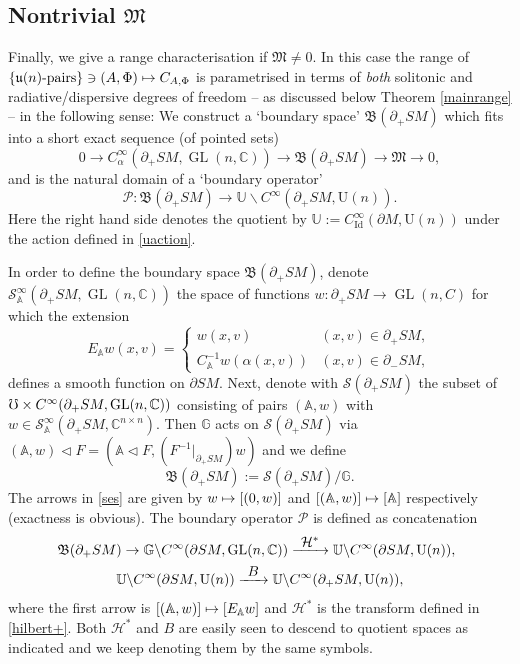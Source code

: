 \documentclass[JEP,XML,SOM,Unicode,published]{cedram}
\newcommand\To[1]{\mathchoice{\xrightarrow{\textstyle\kern4pt#1\kern3pt}}{\stackrel{#1}{\longrightarrow}}{}{}}
\newcommand\mto{\mathchoice{\longmapsto}{\mapsto}{\mapsto}{\mapsto}}
\DeclareMathOperator{\GL}{GL}
\newcommand{\rU}{\mathrm{U}}
\theoremstyle{plain}
\theoremstyle{definition}
\newcommand{\A}{\mathbb{A}}
\newcommand{\G}{\mathbb{G}}
\newcommand{\C}{\mathbb{C}}
\newcommand{\U}{\mathbb{U}}
\renewcommand{\H}{\mathcal{H}}
\newcommand{\cS}{\mathcal{S}}
\newcommand{\BB}{\mathfrak{B}}
\newcommand{\M}{\mathfrak{M}}
\renewcommand{\u}{\mathfrak{u}}
\newcommand{\Id}{\mathrm{Id}}
\newcommand{\1}{{\bf 1}}
\let\act\triangleleft
\begin{document}
\subsection{Nontrivial $\mathfrak{M}$} Finally, we give a range characterisation if $\M\neq 0$. In this case the range of $\{\u(n)\text{-pairs}\} \ni (A,\Phi) \mto C_{A,\Phi}$ is parametrised in terms of \emph{both} solitonic and radiative/dispersive degrees of freedom -- as discussed below Theorem \ref{mainrange} -- in the following sense: We construct
a `boundary space' $\BB(\partial_+SM)$ which fits into a short exact sequence (of pointed sets)
\begin{equation}\label{ses}
0\to C_\alpha^\infty(\partial_+SM,\GL(n,\C)) \to \BB(\partial_+SM) \to \M \to 0,
\end{equation}
and is the natural domain of a `boundary operator'
\begin{equation*}
\mathcal{P}:\BB(\partial_+SM) \to \U\backslash C^\infty(\partial_+ SM,\rU(n)).
\end{equation*}
Here the right hand side denotes the quotient by $\U:=C_\Id^\infty(\partial M,\rU(n))$ under the action defined in \eqref{uaction}.
\smallskip

In order to define the boundary space $\BB(\partial_+SM)$, denote
$\cS_\A^\infty(\partial_+SM,\GL(n,\C))$ the space of functions $w:\partial_+SM\to \GL(n,
C)$ for which the extension
\begin{equation*}
E_\A w(x,v) = \begin{cases}
w(x,v) & (x,v)\in \partial_+SM,\\
C_\A^{-1} w(\alpha(x,v)) & (x,v)\in \partial_-SM,
\end{cases}
\end{equation*}
defines a smooth function on $\partial SM$. Next, denote with $\cS(\partial_+SM)$ the subset of $\mho \times\nobreak C^\infty(\partial_+SM,\GL(n,\C))$ consisting of pairs $(\A,w)$ with $w\in \cS_\A^\infty(\partial_+SM,\C^{n\times n})$. Then $\G$ acts on $\cS(\partial_+SM)$ via
$
(\A,w)\act F=(\A\act F,(F^{-1}\vert_{\partial_+SM})w)
$
and we define
\begin{equation*}
\BB(\partial_+SM):=\cS(\partial_+SM)/\G.
\end{equation*}
The arrows in \eqref{ses} are given by $w\mto [(0,w)]$ and $[(\A,w)]\mto [\A]$ respectively (exact\-ness is obvious).
The boundary operator $\mathcal{P}$ is defined as concatenation\vspace*{-3pt}
\begin{gather*}
\hspace{-.5em} \BB(\partial_+SM) \to \G \backslash C^\infty(\partial SM,\GL(n,\C))
\To{\H^*}{} \U\backslash C^\infty(\partial S M,\rU(n)),\\
\U\backslash C^\infty(\partial S M,\rU(n)) \To{B}{} \U\backslash C^\infty(\partial_+SM,\rU(n)),
\end{gather*}
where the first arrow is $[(\A,w)]\mto [E_\A w]$ and
$\H^*$ is the transform defined in \eqref{hilbert+}. Both $\H^*$ and $B$ are easily seen to descend to quotient spaces as indicated and we keep denoting them by the same symbols.
\end{document}
